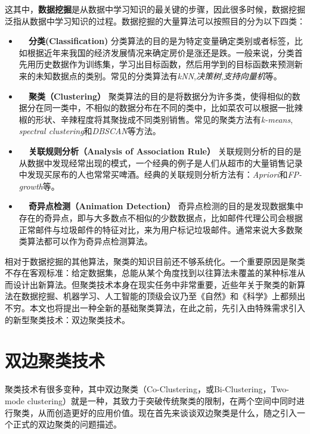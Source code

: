\vspace{2mm}
这其中，\textbf{数据挖掘}是从数据中学习知识的最关键的步骤，因此很多时候，数据挖掘泛指从数据中学习知识的过程。数据挖掘的大量算法可以按照目的分为以下四类：

\begin{itemize}
    \item \textbf{~~分类(Classification)} 分类算法的目的是为特定变量确定类别或者标签，比如根据近年来我国的经济发展情况来确定房价是涨还是跌。一般来说，分类首先用历史数据作为训练集，学习出目标函数，然后用学到的目标函数来预测新来的未知数据点的类别。常见的分类算法有\emph{kNN}\cite{peterson2009k},\emph{决策树}\cite{quinlan1986induction},\emph{支持向量机}\cite{cortes1995support}等。
    \item \textbf{~~聚类（Clustering）} 聚类算法的目的是将数据分为许多类，使得相似的数据分在同一类中，不相似的数据分布在不同的类中，比如菜农可以根据一批辣椒的形状、辛辣程度将其聚拢成不同类别销售。常见的聚类方法有\emph{k-means}\cite{hartigan1979algorithm}, \emph{spectral clustering}\cite{ng2002spectral}和\emph{DBSCAN}\cite{ester1996density}等方法。
    \item \textbf{~~关联规则分析（Analysis of Association Rule）} 关联规则分析的目的是从数据中发现经常出现的模式，一个经典的例子是人们从超市的大量销售记录中发现买尿布的人也常常买啤酒。经典的关联规则分析方法有：\emph{Apriori}\cite{agrawal1994fast}和\emph{FP-growth}\cite{han2000mining}等。
    \item \textbf{~~奇异点检测（Animation Detection）} 奇异点检测的目的是发现数据集中存在的奇异点，即与大多数点不相似的少数数据点，比如邮件代理公司会根据正常邮件与垃圾邮件的特征对比，来为用户标记垃圾邮件。通常来说大多数聚类算法都可以作为奇异点检测算法。
\end{itemize}

\vspace{2mm}
相对于数据挖掘的其他算法，聚类的知识目前还不够系统化。一个重要原因是聚类不存在客观标准：给定数据集，总能从某个角度找到以往算法未覆盖的某种标准从而设计出新算法\cite{estivill2002so}。但聚类技术本身在现实任务中非常重要，近些年关于聚类的新算法在数据挖掘、机器学习、人工智能的顶级会议乃至《自然》和《科学》上都频出不穷。本文也将提出一种全新的基础聚类算法，在此之前，先引入由特殊需求引入的新型聚类技术：双边聚类技术。



\section{双边聚类技术}
聚类技术有很多变种，其中双边聚类（Co-Clustering，或Bi-Clustering，Two-mode clustering）就是一种，其致力于突破传统聚类的限制，在两个空间中同时进行聚类，从而创造更好的应用价值。现在首先来谈谈双边聚类是什么，随之引入一个正式的双边聚类的问题描述。

